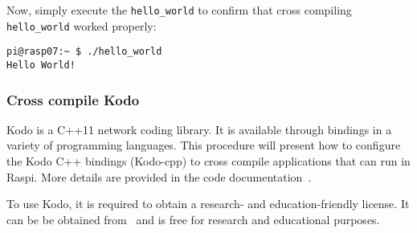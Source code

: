 Now, simply execute the \texttt{hello\_world} to confirm that cross compiling
\texttt{hello\_world} worked properly:

\begin{lstlisting}[]
pi@rasp07:~ $ ./hello_world
Hello World!
\end{lstlisting}
\FloatBarrier
\vspace{-5mm}

\subsubsection{Cross compile Kodo}

Kodo is a C++11 network coding library. It is available through bindings in
a variety of programming languages.
This procedure will present how to configure the Kodo C++ bindings (Kodo-cpp)
to cross compile applications that can run in \ac{Raspi}. More details are
provided in the code documentation~\cite{kodocppdoc}.


To use Kodo, it is required to obtain a research- and
education-friendly license.
It can be be obtained from~\cite{steinwurflicenselink} and is free
for research and educational purposes.


